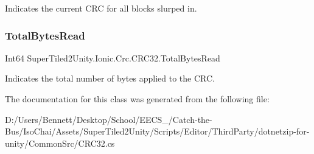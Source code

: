 Indicates the current C\+RC for all blocks slurped in. 

\mbox{\label{class_super_tiled2_unity_1_1_ionic_1_1_crc_1_1_c_r_c32_ac5179e08a9efec03818f9742d2fe3f41}} 
\subsubsection{\texorpdfstring{Total\+Bytes\+Read}{TotalBytesRead}}
{\footnotesize\ttfamily Int64 Super\+Tiled2\+Unity.\+Ionic.\+Crc.\+C\+R\+C32.\+Total\+Bytes\+Read\hspace{0.3cm}{\ttfamily [get]}}



Indicates the total number of bytes applied to the C\+RC. 



The documentation for this class was generated from the following file\+:\begin{DoxyCompactItemize}
\item 
D\+:/\+Users/\+Bennett/\+Desktop/\+School/\+E\+E\+C\+S\+\_/\+Catch-\/the-\/\+Bus/\+Iso\+Chai/\+Assets/\+Super\+Tiled2\+Unity/\+Scripts/\+Editor/\+Third\+Party/dotnetzip-\/for-\/unity/\+Common\+Src/C\+R\+C32.\+cs\end{DoxyCompactItemize}
